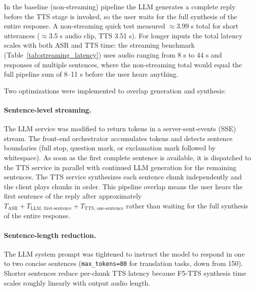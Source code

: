 \documentclass[12pt, a4paper]{article}
\begin{document}
In the baseline (non-streaming) pipeline the LLM generates a complete reply before the TTS stage is invoked, so the user waits for the full synthesis of the entire response. A non-streaming quick test measured $\approx$3.99 s total for short utterances ($\approx$3.5 s audio clip, TTS 3.51 s). For longer inputs the total latency scales with both ASR and TTS time: the streaming benchmark (Table~\ref{tab:streaming_latency}) uses audio ranging from 8 s to 44 s and responses of multiple sentences, where the non-streaming total would equal the full pipeline sum of 8--11 s before the user hears anything.

Two optimizations were implemented to overlap generation and synthesis:

\paragraph{Sentence-level streaming.}
The LLM service was modified to return tokens in a server-sent-events (SSE) stream. The front-end orchestrator accumulates tokens and detects sentence boundaries (full stop, question mark, or exclamation mark followed by whitespace). As soon as the first complete sentence is available, it is dispatched to the TTS service in parallel with continued LLM generation for the remaining sentences. The TTS service synthesizes each sentence chunk independently and the client plays chunks in order. This pipeline overlap means the user hears the first sentence of the reply after approximately $T_{\text{ASR}} + T_{\text{LLM, first-sentence}} + T_{\text{TTS, one-sentence}}$ rather than waiting for the full synthesis of the entire response.

\paragraph{Sentence-length reduction.}
The LLM system prompt was tightened to instruct the model to respond in one to two concise sentences (\texttt{max\_tokens=80} for translation tasks, down from 150). Shorter sentences reduce per-chunk TTS latency because F5-TTS synthesis time scales roughly linearly with output audio length.
\end{document}
